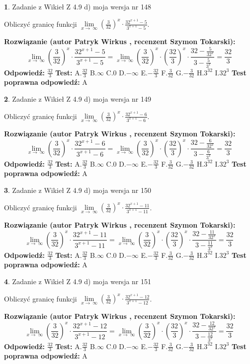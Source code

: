 \documentclass[12pt, a4paper]{article}
\theoremstyle{definition} %
\newtheorem{zad}{}
\newcommand{\zadStart}[1]{\begin{zad}#1\newline}
\newcommand{\zadStop}{\end{zad}}
\newcommand{\rozwStart}[2]{\noindent \textbf{Rozwiązanie (autor #1 , recenzent #2): }\newline}
\newcommand{\rozwStop}{\newline}
\newcommand{\odpStart}{\noindent \textbf{Odpowiedź:}\newline}
\newcommand{\odpStop}{\newline}
\newcommand{\testStart}{\noindent \textbf{Test:}\newline}
\newcommand{\testStop}{\newline}
\newcommand{\kluczStart}{\noindent \textbf{Test poprawna odpowiedź:}\newline}
\newcommand{\kluczStop}{\newline}
\begin{document}
\zadStart{Zadanie z Wikieł Z 4.9 d) moja wersja nr 148}


Obliczyć granicę funkcji  $\lim\limits_{x\to\ \infty}(\frac{3}{32})^{x}\cdot\frac{32^{x+1}-5}{3^{x+1}-5}$.
\zadStop
\rozwStart{Patryk Wirkus}{Szymon Tokarski}
$$\lim\limits_{x\to\ \infty}(\frac{3}{32})^{x}\cdot\frac{32^{x+1}-5}{3^{x+1}-5}=\lim\limits_{x\to\ \infty}(\frac{3}{32})^{x}\cdot(\frac{32}{3})^{x} \cdot \frac{32-\frac{5}{32^{x}}}{3-\frac{5}{3^{x}}} = \frac{32}{3}$$
\rozwStop
\odpStart
$\frac{32}{3}$
\odpStop
\testStart
A.$\frac{32}{3}$ B.$\infty$ C.$0$ D.$-\infty$ E.$-\frac{32}{3}$
F.$\frac{3}{32}$ G.$-\frac{3}{32}$
H.$3^{32}$
I.$32^{3}$
\testStop
\kluczStart
A
\kluczStop



\zadStart{Zadanie z Wikieł Z 4.9 d) moja wersja nr 149}


Obliczyć granicę funkcji  $\lim\limits_{x\to\ \infty}(\frac{3}{32})^{x}\cdot\frac{32^{x+1}-6}{3^{x+1}-6}$.
\zadStop
\rozwStart{Patryk Wirkus}{Szymon Tokarski}
$$\lim\limits_{x\to\ \infty}(\frac{3}{32})^{x}\cdot\frac{32^{x+1}-6}{3^{x+1}-6}=\lim\limits_{x\to\ \infty}(\frac{3}{32})^{x}\cdot(\frac{32}{3})^{x} \cdot \frac{32-\frac{6}{32^{x}}}{3-\frac{6}{3^{x}}} = \frac{32}{3}$$
\rozwStop
\odpStart
$\frac{32}{3}$
\odpStop
\testStart
A.$\frac{32}{3}$ B.$\infty$ C.$0$ D.$-\infty$ E.$-\frac{32}{3}$
F.$\frac{3}{32}$ G.$-\frac{3}{32}$
H.$3^{32}$
I.$32^{3}$
\testStop
\kluczStart
A
\kluczStop



\zadStart{Zadanie z Wikieł Z 4.9 d) moja wersja nr 150}


Obliczyć granicę funkcji  $\lim\limits_{x\to\ \infty}(\frac{3}{32})^{x}\cdot\frac{32^{x+1}-11}{3^{x+1}-11}$.
\zadStop
\rozwStart{Patryk Wirkus}{Szymon Tokarski}
$$\lim\limits_{x\to\ \infty}(\frac{3}{32})^{x}\cdot\frac{32^{x+1}-11}{3^{x+1}-11}=\lim\limits_{x\to\ \infty}(\frac{3}{32})^{x}\cdot(\frac{32}{3})^{x} \cdot \frac{32-\frac{11}{32^{x}}}{3-\frac{11}{3^{x}}} = \frac{32}{3}$$
\rozwStop
\odpStart
$\frac{32}{3}$
\odpStop
\testStart
A.$\frac{32}{3}$ B.$\infty$ C.$0$ D.$-\infty$ E.$-\frac{32}{3}$
F.$\frac{3}{32}$ G.$-\frac{3}{32}$
H.$3^{32}$
I.$32^{3}$
\testStop
\kluczStart
A
\kluczStop



\zadStart{Zadanie z Wikieł Z 4.9 d) moja wersja nr 151}


Obliczyć granicę funkcji  $\lim\limits_{x\to\ \infty}(\frac{3}{32})^{x}\cdot\frac{32^{x+1}-12}{3^{x+1}-12}$.
\zadStop
\rozwStart{Patryk Wirkus}{Szymon Tokarski}
$$\lim\limits_{x\to\ \infty}(\frac{3}{32})^{x}\cdot\frac{32^{x+1}-12}{3^{x+1}-12}=\lim\limits_{x\to\ \infty}(\frac{3}{32})^{x}\cdot(\frac{32}{3})^{x} \cdot \frac{32-\frac{12}{32^{x}}}{3-\frac{12}{3^{x}}} = \frac{32}{3}$$
\rozwStop
\odpStart
$\frac{32}{3}$
\odpStop
\testStart
A.$\frac{32}{3}$ B.$\infty$ C.$0$ D.$-\infty$ E.$-\frac{32}{3}$
F.$\frac{3}{32}$ G.$-\frac{3}{32}$
H.$3^{32}$
I.$32^{3}$
\testStop
\kluczStart
A
\kluczStop
\end{document}
